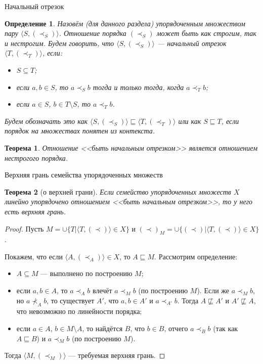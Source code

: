 \documentclass[aspectratio=169]{beamer}
\newtheorem{thm}{Теорема}[section]
\newtheorem{dfn}{Определение}[section]
\begin{document}
\begin{frame}{Начальный отрезок}

\begin{dfn}
Назовём (для данного раздела) упорядоченным множеством пару $\langle S, (\prec_S)\rangle$.
Отношение порядка $(\prec_S)$ может быть как строгим, так и нестрогим.
Будем говорить, что $\langle S, (\prec_S)\rangle$ --- начальный отрезок $\langle T, (\prec_T) \rangle$,
если:\begin{itemize}
\item $S \subseteq T$;
\item если $a,b \in S$, то $a \prec_S b$ тогда и только тогда, когда $a \prec_T b$;
\item если $a \in S$, $b \in T\setminus S$, то $a \prec_T b$.
\end{itemize}
Будем обозначать это как $\langle S, (\prec_S)\rangle\sqsubseteq\langle T, (\prec_T)\rangle$ или как $S \sqsubseteq T$, если порядок на множествах понятен из контекста.
\end{dfn}

\begin{thm}
Отношение <<быть начальным отрезком>> является отношением нестрогого порядка.
\end{thm}
\end{frame}

\begin{frame}{Верхняя грань семейства упорядоченных множеств}
\begin{thm}[о верхней грани]
Если семейство упорядоченных множеств $X$ линейно упорядочено отношением <<быть начальным отрезком>>, то у него есть верхняя грань.
\end{thm}

\begin{proof}
Пусть $M = \cup \{ T | \langle T, (\prec) \rangle \in X \}$ и
$(\prec)_M = \cup \{ (\prec) | \langle T, (\prec) \rangle \in X \}$.

Покажем, что если $\langle A, (\prec_A)\rangle \in X$, то $A \sqsubseteq M$. Рассмотрим определение:
\begin{itemize}
\item $A \subseteq M$ --- выполнено по построению $M$;
\item если $a,b \in A$, то $a \prec_A b$ влечёт $a \prec_M b$ (по построению $M$). Если же $a \prec_M b$, но $a \not\prec_A b$,
то существует $A'$, что $a,b \in A'$ и $a \prec_{A'} b$. Тогда $A\not\sqsubseteq A'$ и $A'\not\sqsubseteq A$, что невозможно
по линейности порядка;
\item если $a \in A$, $b \in M\setminus A$, то найдётся $B$, что $b\in B$, отчего $a \prec_B b$ (так как $A \sqsubseteq B$) 
и $a \prec_M b$ (по построению $M$).
\end{itemize}
Тогда $\langle M, (\prec_M)\rangle$ --- требуемая верхняя грань.
\end{proof}

\end{frame}
\end{document}
